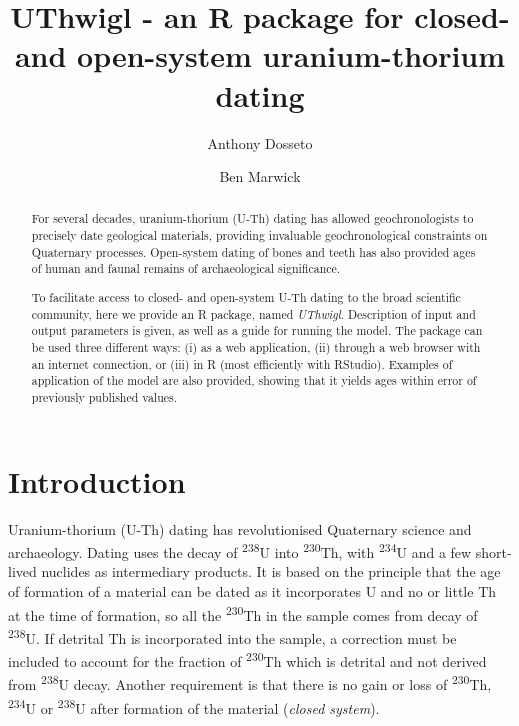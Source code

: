 \documentclass[]{elsarticle} %
\begin{document}
\begin{frontmatter}

  \title{UThwigl - an R package for closed- and open-system uranium-thorium dating}
    \author[University of Wollongong]{Anthony Dosseto}
    \author[University of Washington]{Ben Marwick}
      \address[University of Wollongong]{Wollongong Isotope Geochronology Laboratory, School of Earth, Atmospheric \& Life Sciences, University of Wollongong, Wollongong NSW Australia}
    \address[University of Washington]{Department of Anthropology, University of Washington, Seattle, WA, USA}
    
  \begin{abstract}
  For several decades, uranium-thorium (U-Th) dating has allowed geochronologists to precisely date geological materials, providing invaluable geochronological constraints on Quaternary processes. Open-system dating of bones and teeth has also provided ages of human and faunal remains of archaeological significance.

  To facilitate access to closed- and open-system U-Th dating to the broad scientific community, here we provide an R package, named \emph{UThwigl}. Description of input and output parameters is given, as well as a guide for running the model. The package can be used three different ways: (i) as a web application, (ii) through a web browser with an internet connection, or (iii) in R (most efficiently with RStudio). Examples of application of the model are also provided, showing that it yields ages within error of previously published values.
  \end{abstract}
  
 \end{frontmatter}

\newpage
\linenumbers

\hypertarget{introduction}{%
\section{Introduction}\label{introduction}}

Uranium-thorium (U-Th) dating has revolutionised Quaternary science and archaeology. Dating uses the decay of \textsuperscript{238}U into \textsuperscript{230}Th, with \textsuperscript{234}U and a few short-lived nuclides as intermediary products. It is based on the principle that the age of formation of a material can be dated as it incorporates U and no or little Th at the time of formation, so all the \textsuperscript{230}Th in the sample comes from decay of \textsuperscript{238}U. If detrital Th is incorporated into the sample, a correction must be included to account for the fraction of \textsuperscript{230}Th which is detrital and not derived from \textsuperscript{238}U decay. Another requirement is that there is no gain or loss of \textsuperscript{230}Th, \textsuperscript{234}U or \textsuperscript{238}U after formation of the material (\emph{closed system}).
\end{document}
